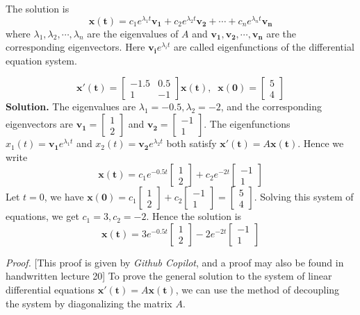 \documentclass[10pt, a4paper]{article}
\newcommand{\vt}[1]{\mathbf{#1}}
\begin{document}
\indent The solution is \[
\vt{x(t)} = c_1 e^{\lambda_1 t}\vt{v_1} + c_2 e^{\lambda_2 t}\vt{v_2} + \cdots + c_n e^{\lambda_n t}\vt{v_n}
\]
where $\lambda_1,\lambda_2,\cdots,\lambda_n$ are the eigenvalues of $A$ and $\vt{v_1},\vt{v_2},\cdots,\vt{v_n}$ are the corresponding eigenvectors. 
Here $\vt{v_i}e^{\lambda_i t}$ are called eigenfunctions of the differential equation system.
\begin{example}
    \[
    \vt{x'(t)} = \begin{bmatrix}
        -1.5&0.5\\
        1&-1
    \end{bmatrix}
    \vt{x(t)}
    ,\;\;
    \vt{x(0)} = \begin{bmatrix}
        5\\
        4
    \end{bmatrix}
    \]
    \textbf{Solution.} The eigenvalues are $\lambda_1=-0.5,\lambda_2=-2$, and the corresponding eigenvectors are $\vt{v_1}=\begin{bmatrix}
        1\\
        2
    \end{bmatrix}$ and $\vt{v_2}=\begin{bmatrix}
        -1\\
        1
    \end{bmatrix}$. The eigenfunctions $x_1(t)=\vt{v_1}e^{\lambda_1 t}$ and $x_2(t)=\vt{v_2}e^{\lambda_2 t}$ both satisfy $\vt{x'(t)} = A\vt{x(t)}$. Hence we write\[
    \vt{x(t)} = c_1 e^{-0.5t}\begin{bmatrix}
        1\\
        2
    \end{bmatrix} + c_2 e^{-2t}\begin{bmatrix}
        -1\\
        1
    \end{bmatrix}
    \]
    Let $t=0$, we have $\vt{x(0)}=c_1\begin{bmatrix}
        1\\
        2
    \end{bmatrix} + c_2\begin{bmatrix}
        -1\\
        1
    \end{bmatrix} = \begin{bmatrix}
        5\\
        4
    \end{bmatrix}$. Solving this system of equations, we get $c_1=3,c_2=-2$. Hence the solution is \[
    \vt{x(t)} = 3e^{-0.5t}\begin{bmatrix}
        1\\
        2
    \end{bmatrix} - 2e^{-2t}\begin{bmatrix}
        -1\\
        1
    \end{bmatrix}
    \]
\end{example}
\indent \textit{Proof.} [This proof is given by \textit{Github Copilot}, and a proof may also be found in handwritten lecture 20] 
To prove the general solution to the system of linear differential equations $\vt{x'(t)} = A\vt{x(t)}$, we can use the method of decoupling the system by diagonalizing the matrix $A$.
\end{document}
